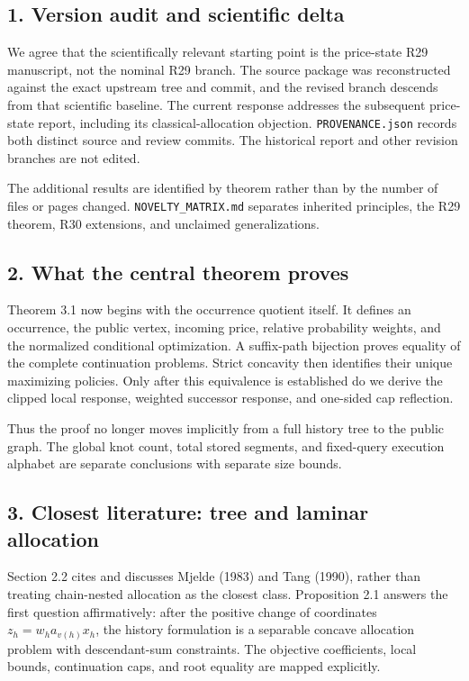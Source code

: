 \documentclass[
  11pt,
]{article}
\begin{document}
\subsection{1. Version audit and scientific
delta}\label{version-audit-and-scientific-delta}

We agree that the scientifically relevant starting point is the
price-state R29 manuscript, not the nominal R29 branch. The source
package was reconstructed against the exact upstream tree and commit,
and the revised branch descends from that scientific baseline. The
current response addresses the subsequent price-state report, including
its classical-allocation objection. \texttt{PROVENANCE.json} records
both distinct source and review commits. The historical report and other
revision branches are not edited.

The additional results are identified by theorem rather than by the
number of files or pages changed. \texttt{NOVELTY\_MATRIX.md} separates
inherited principles, the R29 theorem, R30 extensions, and unclaimed
generalizations.

\subsection{2. What the central theorem
proves}\label{what-the-central-theorem-proves}

Theorem 3.1 now begins with the occurrence quotient itself. It defines
an occurrence, the public vertex, incoming price, relative probability
weights, and the normalized conditional optimization. A suffix-path
bijection proves equality of the complete continuation problems. Strict
concavity then identifies their unique maximizing policies. Only after
this equivalence is established do we derive the clipped local response,
weighted successor response, and one-sided cap reflection.

Thus the proof no longer moves implicitly from a full history tree to
the public graph. The global knot count, total stored segments, and
fixed-query execution alphabet are separate conclusions with separate
size bounds.

\subsection{3. Closest literature: tree and laminar
allocation}\label{closest-literature-tree-and-laminar-allocation}

Section 2.2 cites and discusses Mjelde (1983) and Tang (1990), rather
than treating chain-nested allocation as the closest class. Proposition
2.1 answers the first question affirmatively: after the positive change
of coordinates \(z_h=w_ha_{v(h)}x_h\), the history formulation is a
separable concave allocation problem with descendant-sum constraints.
The objective coefficients, local bounds, continuation caps, and root
equality are mapped explicitly.
\end{document}
